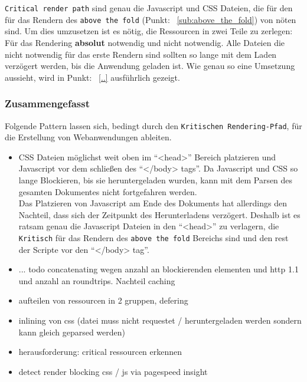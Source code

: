 			\texttt{Critical render path} sind genau die Javascript und CSS Dateien, die für den für das Rendern des \texttt{above the fold} (Punkt: ~\ref{sub:above_the_fold}) von nöten sind. Um dies umzusetzen ist es nötig, die Ressourcen in zwei Teile zu zerlegen: Für das Rendering \textbf{absolut} notwendig und nicht notwendig. Alle Dateien die nicht notwendig für das erste Rendern sind sollten so lange mit dem Laden verzögert werden, bis die Anwendung geladen ist. Wie genau so eine Umsetzung aussieht, wird in Punkt: ~\ref{..} ausführlich gezeigt.


		\subsubsection{Zusammengefasst} %
		\label{ssub:zusammengefasst}
		  Folgende Pattern lassen sich, bedingt durch den \texttt{Kritischen Rendering-Pfad}, für die Erstellung von Webanwendungen ableiten.

			\begin{itemize}
				\item CSS Dateien möglichst weit oben im "`<head>"' Bereich platzieren und Javascript vor dem schließen des "`</body> tags"'. Da Javascript und CSS so lange Blockieren, bis sie heruntergeladen wurden, kann mit dem Parsen des gesamten Dokumentes nicht fortgefahren werden. \autocite{placingScripts}\\
				Das Platzieren von Javascript am Ende des Dokuments hat allerdings den Nachteil, dass sich der Zeitpunkt des Herunterladens verzögert. Deshalb ist es ratsam genau die Javascript Dateien in den "`<head>"' zu verlagern, die \texttt{Kritisch} für das Rendern des \texttt{above the fold} Bereichs sind und den rest der Scripte vor den "`</body> tag"'. 
				\item ... todo concatenating wegen anzahl an blockierenden elementen und http 1.1 und anzahl an roundtrips. Nachteil caching
				\item aufteilen von ressourcen in 2 gruppen, defering
				\item inlining von css (datei muss nicht requestet / heruntergeladen werden sondern kann gleich geparsed werden)
				\item herausforderung: critical ressourcen erkennen
				\item detect render blocking css / js via pagespeed insight

			\end{itemize}

